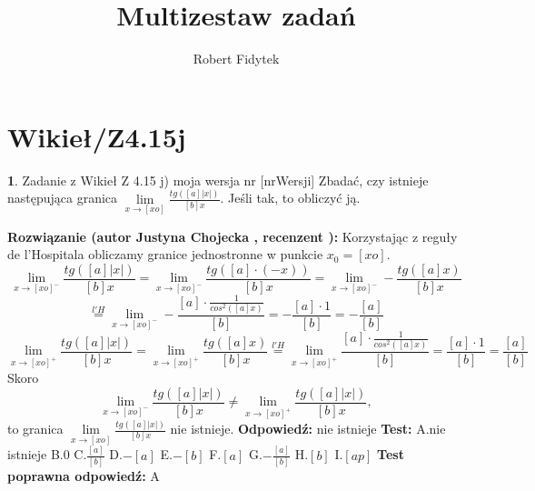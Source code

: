 \documentclass[12pt, a4paper]{article}
\title{Multizestaw zadań}
\author{Robert Fidytek}
\date{}
\theoremstyle{definition} %
\newtheorem{zad}{}
\newcommand{\kategoria}[1]{\section{#1}} %
\newcommand{\zadStart}[1]{\begin{zad}#1\newline} %
\newcommand{\zadStop}{\end{zad}}   %
\newcommand{\rozwStart}[2]{\noindent \textbf{Rozwiązanie (autor #1 , recenzent #2): }\newline} %
\newcommand{\rozwStop}{\newline}                                            %
\newcommand{\odpStart}{\noindent \textbf{Odpowiedź:}\newline}    %
\newcommand{\odpStop}{\newline}                                             %
\newcommand{\testStart}{\noindent \textbf{Test:}\newline} %
\newcommand{\testStop}{\newline} %
\newcommand{\kluczStart}{\noindent \textbf{Test poprawna odpowiedź:}\newline} %
\newcommand{\kluczStop}{\newline} %
\begin{document}
\maketitle


\kategoria{Wikieł/Z4.15j}
\zadStart{Zadanie z Wikieł Z 4.15 j) moja wersja nr [nrWersji]}
Zbadać, czy istnieje następująca granica $\lim\limits_{x\to [xo]}\frac{tg([a]|x|)}{[b]x}$. Jeśli tak, to obliczyć ją.
\zadStop
\rozwStart{Justyna Chojecka}{}
Korzystając z reguły de l'Hospitala obliczamy granice jednostronne w punkcie $x_{0}=[xo]$.
$$\lim\limits_{x\to [xo]^{-}}\frac{tg([a]|x|)}{[b]x}=\lim\limits_{x\to [xo]^{-}}\frac{tg([a]\cdot(-x))}{[b]x}=\lim\limits_{x\to [xo]^{-}}-\frac{tg([a]x)}{[b]x} $$$$\overset{l'H} {=}\lim\limits_{x\to [xo]^{-}}-\frac{[a]\cdot\frac{1}{cos^{2}([a]x)}}{[b]}=-\frac{[a]\cdot 1}{[b]}=-\frac{[a]}{[b]}$$
$$\lim\limits_{x\to [xo]^{+}}\frac{tg([a]|x|)}{[b]x}=\lim\limits_{x\to [xo]^{+}}\frac{tg([a]x)}{[b]x} \overset{l'H} {=}\lim\limits_{x\to [xo]^{+}}\frac{[a]\cdot\frac{1}{cos^{2}([a]x)}}{[b]}=\frac{[a]\cdot 1}{[b]}=\frac{[a]}{[b]}$$
Skoro 
$$\lim\limits_{x\to [xo]^{-}}\frac{tg([a]|x|)}{[b]x}\neq \lim\limits_{x\to [xo]^{+}}\frac{tg([a]|x|)}{[b]x},$$
to granica $\lim\limits_{x\to [xo]}\frac{tg([a]|x|)}{[b]x}$ nie istnieje.
\rozwStop
\odpStart
nie istnieje
\odpStop
\testStart
A.nie istnieje
B.0
C.$\frac{[a]}{[b]}$
D.$-[a]$
E.$-[b]$
F.$[a]$
G.$-\frac{[a]}{[b]}$
H.$[b]$
I.$[ap]$
\testStop
\kluczStart
A
\kluczStop
\end{document}
